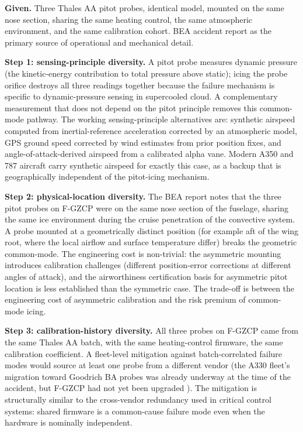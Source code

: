 \textbf{Given.} Three Thales AA pitot probes, identical model,
mounted on the same nose section, sharing the same heating
control, the same atmospheric environment, and the same
calibration cohort. BEA accident report
\cite{acc:bea-af447} as the primary source of operational and
mechanical detail.

\textbf{Step 1: sensing-principle diversity.} A pitot probe
measures dynamic pressure (the kinetic-energy contribution to
total pressure above static); icing the probe orifice destroys
all three readings together because the failure mechanism is
specific to dynamic-pressure sensing in supercooled cloud. A
complementary measurement that does not depend on the pitot
principle removes this common-mode pathway. The working
sensing-principle alternatives are: synthetic airspeed computed
from inertial-reference acceleration corrected by an atmospheric
model, GPS ground speed corrected by wind estimates from prior
position fixes, and angle-of-attack-derived airspeed from a
calibrated alpha vane. Modern A350 and 787 aircraft carry
synthetic airspeed for exactly this case, as a backup that is
geographically independent of the pitot-icing mechanism.

\textbf{Step 2: physical-location diversity.} The BEA report
notes that the three pitot probes on F-GZCP were on the same
nose section of the fuselage, sharing the same ice environment
during the cruise penetration of the convective system. A probe
mounted at a geometrically distinct position (for example aft of
the wing root, where the local airflow and surface temperature
differ) breaks the geometric common-mode. The engineering cost
is non-trivial: the asymmetric mounting introduces calibration
challenges (different position-error corrections at different
angles of attack), and the airworthiness certification basis for
asymmetric pitot location is less established than the symmetric
case. The trade-off is between the engineering cost of asymmetric
calibration and the risk premium of common-mode icing.

\textbf{Step 3: calibration-history diversity.} All three probes
on F-GZCP came from the same Thales AA batch, with the same
heating-control firmware, the same calibration coefficient. A
fleet-level mitigation against batch-correlated failure modes
would source at least one probe from a different vendor (the
A330 fleet's migration toward Goodrich BA probes was already
underway at the time of the accident, but F-GZCP had not yet
been upgraded \cite{acc:bea-af447}). The mitigation is
structurally similar to the cross-vendor redundancy used in
critical control systems: shared firmware is a common-cause
failure mode even when the hardware is nominally independent.

